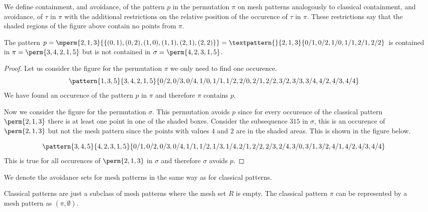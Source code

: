 We define containment, and avoidance, of the pattern \(p\) in the permutation
\(\pi\) on mesh patterns analogously to classical containment, and avoidance,
of \(\tau\) in \(\pi\) with the additional restrictions on the relative
position of the occurence of \(\tau\) in \(\pi\). These restrictions say that
the shaded regions of the figure above contain no points from \(\pi\).

\begin{example}
    The pattern \(p=\mperm{2,1,3}{\{(0,1),(0,2),(1,0),(1,1),(2,1),(2,2)\}}=
    \textpattern{}{ 2, 1, 3 }{ 0/1, 0/2, 1/0, 1/1, 2/1, 2/2 }\) is contained in
    \(\pi = \perm{3,4,2,1,5}\) but is not contained in \(\sigma = \perm{4,2,3,1,5}\).
\end{example}
\begin{proof}
    Let us consider the figure for the permutation \(\pi\) we only need to find one occurence.
    \begin{equation*}
        \pattern{1,3,5}{3,4,2,1,5}{0/2,0/3,0/4,
                                   1/0,1/1,1/2,
                                   2/0,2/1,2/2,
                                   3/2,3/3,3/4,
                                   4/2,4/3,4/4}
    \end{equation*}
    We have found an occurence of the pattern \(p\) in \(\pi\) and therefore
    \(\pi\) contains \(p\).

    Now we consider the figure for the permutation \(\sigma\). This permutation
    avoids \(p\) since for every occurence of the classical pattern \(\perm{2,1,3}\)
    there is at least one point in one of the shaded boxes. Consider the subsequence
    \(315\) in \(\sigma\), this is an occurence of \(\perm{2,1,3}\) but not the mesh
    pattern since the points with values \(4\) and \(2\) are in the shaded areas.
    This is shown in the figure below.

    \begin{equation*}
        \pattern{3,4,5}{4,2,3,1,5}{0/1,0/2,0/3,0/4,
                                   1/1,1/2,1/3,1/4,
                                   2/1,2/2,2/3,2/4,
                                   3/0,3/1,3/2,
                                   4/1,4/2,4/3,4/4}
    \end{equation*}
    This is true for all occurences of \(\perm{2,1,3}\) in \(\sigma\) and
    therefore \(\sigma\) avoids \(p\).
\end{proof}

We denote the avoidance sets for mesh patterns in the same way as for
classical patterns.

\begin{note}
    \label{not:classmesh}
    Classical patterns are just a subclass of mesh patterns where the mesh
    set \(R\) is empty. The classical pattern \(\pi\) can be represented
    by a mesh pattern as \((\pi,\emptyset)\).
\end{note}

